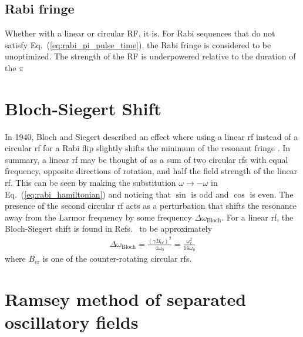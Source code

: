 
\subsection{Rabi fringe}


Whether with a linear or circular RF, it is. For Rabi sequences that do not satisfy Eq.~(\ref{eq:rabi_pi_pulse_time}), the Rabi fringe is considered to be unoptimized. The strength of the RF is underpowered relative to the duration of the $\pi$


\section{Bloch-Siegert Shift}\label{sec:bloch-siegert}


In 1940, Bloch and Siegert described an effect where using a linear \acrshort*{rf} instead of a circular \acrshort*{rf} for a Rabi flip slightly shifts the minimum of the resonant fringe \cite{bloch_magnetic_1940}. In summary, a linear \acrshort*{rf} may be thought of as a sum of two circular \acrshort*{rf}s with equal frequency, opposite directions of rotation, and half the field strength of the linear \acrshort*{rf}. This can be seen by making the substitution $\omega \rightarrow -\omega$ in Eq.~(\ref{eq:rabi_hamiltonian}) and noticing that $\sin$ is odd and $\cos$ is even. The presence of the second circular \acrshort*{rf} acts as a perturbation that shifts the resonance away from the Larmor frequency by some frequency $\Delta\omega_\text{Bloch}$. For a linear \acrshort*{rf}, the Bloch-Siegert shift is found in Refs.~\cite{bloch_magnetic_1940, ramsey_resonance_1955} to be approximately
%
\begin{gather}
    \Delta\omega_\text{Bloch}= \frac{(\gamma B_\text{cr})^2}{4\omega_0} = \frac{\omega_\ell^2}{16\omega_0}
\end{gather}
%
where $B_\text{cr}$ is one of the counter-rotating circular \acrshort*{rf}s.



\section{Ramsey method of separated oscillatory fields\label{sec:ramsey-method}}

